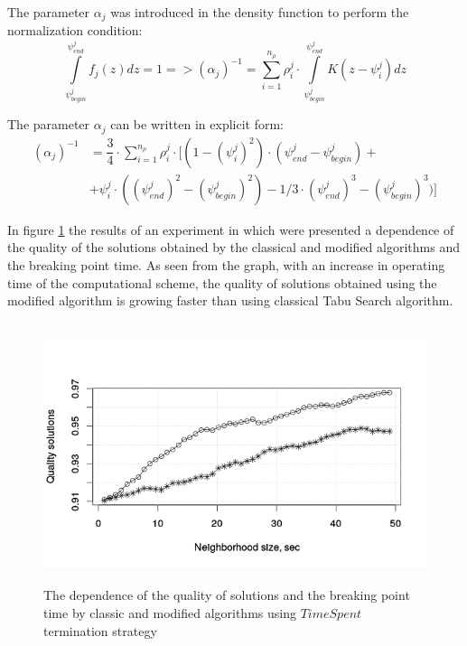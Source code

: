 \documentclass[]{TAACpaper}
\begin{document}
 The parameter $\alpha_j$ was introduced in the density function to perform the normalization condition:
 \begin{equation} \label{norm_cond}
 \int\limits_{\psi^j_{begin}}^{\psi^j_{end}} f_j(z)dz = 1  =>  (\alpha_j)^{-1} = \sum\limits_{i=1}^{n_{\rho}} \rho^j_i \cdot  \int\limits_{\psi^j_{begin}}^{\psi^j_{end}} K(z -  \psi^j_i) dz 
 \end{equation}

 The parameter $\alpha_j$ can be written in explicit form:
  \begin{equation} \label{norm_cond}
 \begin{split}
 (\alpha_j)^{-1} & = \dfrac{3}{4} \cdot \sum\limits_{i=1}^{n_{\rho}} \rho^j_i \cdot [(1 - (\psi^j_i)^2) \cdot (\psi^j_{end} - \psi^j_{begin}) + \\
 & + \psi^j_i \cdot ((\psi^j_{end})^2 - (\psi^j_{begin})^2) - 1/3 \cdot (\psi^j_{end})^3 - (\psi^j_{begin})^3)]
 \end{split}
 \end{equation}
 
 In figure \ref{aba:fig5} the results of an experiment in which  were presented a dependence of the quality of the solutions obtained by the classical and modified algorithms and  the breaking point time. As seen from the graph, with an increase in operating time of the computational scheme, the quality of solutions obtained using the modified algorithm is growing faster than using classical Tabu Search algorithm.
 
 \begin{figure}[h]
 	\hfil\includegraphics[height=3.0in]{images/tabu_mod.png}\hfil
 	\caption
 	{
 		The dependence of the quality of solutions and  the breaking point time by classic and modified algorithms using $ TimeSpent $ termination strategy
 	}
 	\label{aba:fig5}
 \end{figure}
 
\end{document}
